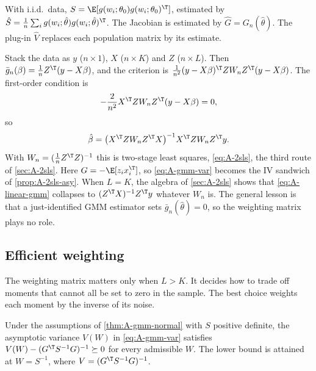 With i.i.d.\ data, $S = \E[g(w_i;\theta_0)g(w_i;\theta_0)^\T]$, estimated by $\hat S = \frac{1}{n}\sum_i g(w_i;\hat\theta)
g(w_i;\hat\theta)^\T$. The Jacobian is estimated by $\hat G = G_n(\hat\theta)$. The plug-in $\hat V$ replaces each
population matrix by its estimate.

Stack the data as $y$ ($n \times 1$), $X$ ($n \times K$) and $Z$ ($n \times L$). Then $\bar g_n(\beta) = \frac{1}{n}Z^\T(y -
X\beta)$, and the criterion is $\frac{1}{n^2}(y - X\beta)^\T ZW_nZ^\T(y - X\beta)$. The first-order condition is
\begin{equation*}
  -\frac{2}{n^2}X^\T ZW_nZ^\T(y - X\beta) = 0,
\end{equation*}
so
\begin{equation}\label{eq:A-linear-gmm}
  \hat\beta = \big(X^\T ZW_nZ^\T X\big)^{-1}X^\T ZW_nZ^\T y.
\end{equation}
With $W_n = (\frac{1}{n}Z^\T Z)^{-1}$ this is two-stage least squares, \eqref{eq:A-2sls}, the third route of
\cref{sec:A-2sls}. Here $G = -\E[z_ix_i^\T]$, so \eqref{eq:A-gmm-var} becomes the IV sandwich of
\cref{prop:A-2sls-asy}. When $L = K$, the algebra of \cref{sec:A-2sls} shows that \eqref{eq:A-linear-gmm} collapses to
$(Z^\T X)^{-1}Z^\T y$ whatever $W_n$ is. The general lesson is that a just-identified GMM estimator sets
$\bar g_n(\hat\theta) = 0$, so the weighting matrix plays no role.

\subsection{Efficient weighting}\label{sec:A-gmm-efficient}

The weighting matrix matters only when $L > K$. It decides how to trade off moments that cannot all be set to zero in the
sample. The best choice weights each moment by the inverse of its noise.

\begin{proposition}\label{prop:A-efficient-gmm}
Under the assumptions of \cref{thm:A-gmm-normal} with $S$ positive definite, the asymptotic variance $V(W)$ in
\eqref{eq:A-gmm-var} satisfies $V(W) - (G^\T S^{-1}G)^{-1} \succeq 0$ for every admissible $W$. The lower bound is attained
at $W = S^{-1}$, where $V = (G^\T S^{-1}G)^{-1}$.
\end{proposition}

